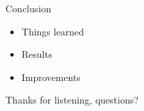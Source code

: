 \documentclass{beamer}
\begin{document}
\begin{frame}{Conclusion}
	\begin{itemize}
		\item Things learned
		\pause \item Results
		\pause \item Improvements
	\end{itemize}
\end{frame}

\begin{frame}
	Thanks for listening, questions?
\end{frame}
\end{document}
